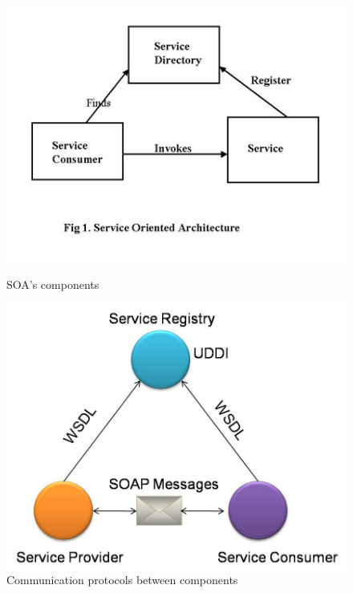 \documentclass[12pt]{article}
\begin{document}
\begin{figure}[here!]
\centering
\begin{minipage}[h]{0.4\textwidth}
\centering
    \includegraphics[width=1.0\textwidth]{images/arg3}
    \caption{SOA's components \cite{arg3}}
    \label{fig:eai0}
\end{minipage}
\begin{minipage}[h]{0.19\textwidth}
\vfill
\end{minipage}
\begin{minipage}[h]{0.4\textwidth}
\centering
    \includegraphics[width=1.0\textwidth]{images/arg1}
    \caption{Communication protocols between components \cite{arg1}}
    \label{fig:eai1}
\end{minipage}
\end{figure}
\FloatBarrier
\end{document}
